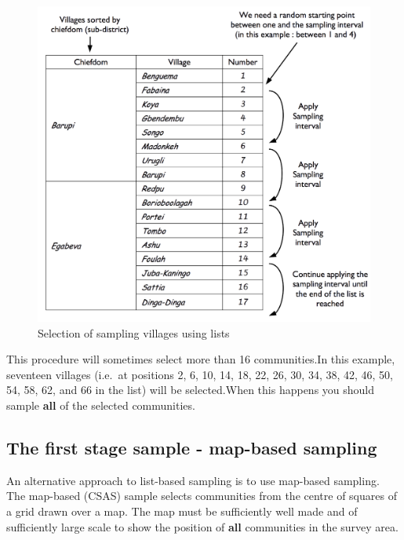 \documentclass[12pt,]{book}
\theoremstyle{definition}
\theoremstyle{definition}
\theoremstyle{definition}
\theoremstyle{remark}
\begin{document}
\begin{figure}[h]

{\centering \includegraphics[width=16.67in]{figures/listSample2} 

}

\caption{Selection of sampling villages using lists}\label{fig:sample4}
\end{figure}

This procedure will sometimes select more than 16 communities.In this
example, seventeen villages (i.e.~at positions 2, 6, 10, 14, 18, 22, 26,
30, 34, 38, 42, 46, 50, 54, 58, 62, and 66 in the list) will be
selected.When this happens you should sample \textbf{all} of the
selected communities.

\hypertarget{the-first-stage-sample---map-based-sampling}{%
\subsection{The first stage sample - map-based
sampling}\label{the-first-stage-sample---map-based-sampling}}

An alternative approach to list-based sampling is to use map-based
sampling. The map-based (CSAS) sample selects communities from the
centre of squares of a grid drawn over a map. The map must be
sufficiently well made and of sufficiently large scale to show the
position of \textbf{all} communities in the survey area.
\end{document}
